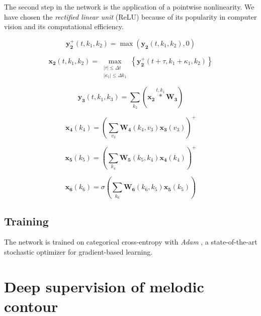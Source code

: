 \documentclass{article}
\begin{document}
The second step in the network is the application of a pointwise nonlinearity. We have chosen the \emph{rectified linear unit} (ReLU) because of its popularity in computer vision and its computational efficiency.
 
 \begin{equation}
 \boldsymbol{y_{2}^{+}}(t,k_1,k_2) = \max \left( \boldsymbol{y_2}(t,k_1,k_2), 0\right)
 \end{equation}
 
 
 
 \begin{equation}
 \boldsymbol{x_2}(t,k_1,k_2) =
 \max_{
\substack{
\vert \tau \vert \leq \Delta t \\
 \vert \kappa_1 \vert \leq \Delta k_1}
 } \left\{
 \boldsymbol{y_{2}^{+}}(t + \tau, k_1 + \kappa_1, k_2)
 \right\}
 \end{equation}
 
 \begin{equation}
 \boldsymbol{y_3}(t,k_1,k_3) =
 \sum_{k_2}
 (\boldsymbol{x_2}
 \overset{t,k_1}{\ast}
 \boldsymbol{W_3})
 \end{equation}

\begin{equation}
\boldsymbol{x_4}(k_4) =
\left(
\sum_{v_3}
\boldsymbol{W_4}(k_4, v_3)
\boldsymbol{x_3}(v_3) \right)^{+}
\end{equation}

\begin{equation}
\boldsymbol{x_5}(k_5) =
\left(
\sum_{k_4}
\boldsymbol{W_5}(k_5, k_4)
\boldsymbol{x_4}(k_4)
\right)^{+}
\end{equation}

\begin{equation}
\boldsymbol{x_6}(k_6) =
\sigma \left(
\sum_{k_6}
\boldsymbol{W_6}(k_6,k_5)
\boldsymbol{x_5}(k_5)
\right)
\end{equation}



\subsection{Training}
The network is trained on categorical cross-entropy with \emph{Adam} \cite{Kingma2015}, a state-of-the-art stochastic optimizer for gradient-based learning.

\section{Deep supervision of melodic contour}
\end{document}
